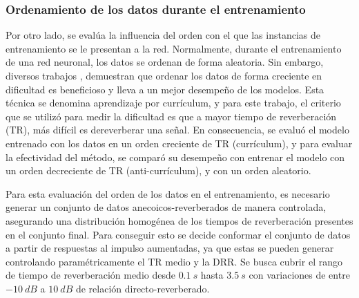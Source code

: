 \subsubsection{Ordenamiento de los datos durante el entrenamiento}

Por otro lado, se evalúa la influencia del orden con el que las instancias de entrenamiento se le presentan a la red. Normalmente, durante el entrenamiento de una red neuronal, los datos se ordenan de forma aleatoria. Sin embargo, diversos trabajos \cite{cv, cl1, cl2}, demuestran que ordenar los datos de forma creciente en dificultad es beneficioso y lleva a un mejor desempeño de los modelos. Esta técnica se denomina aprendizaje por currículum, y para este trabajo, el criterio que se utilizó para medir la dificultad es que a mayor tiempo de reverberación (TR), más difícil es dereverberar una señal. En consecuencia, se evaluó el modelo entrenado con los datos en un orden creciente de TR (currículum), y para evaluar la efectividad del método, se comparó su desempeño con entrenar el modelo con un orden decreciente de TR (anti-currículum), y con un orden aleatorio.

Para esta evaluación del orden de los datos en el entrenamiento, es necesario generar un conjunto de datos anecoicos-reverberados de manera controlada, asegurando una distribución homogénea de los tiempos de reverberación presentes en el conjunto final. Para conseguir esto se decide conformar el conjunto de datos a partir de respuestas al impulso aumentadas, ya que estas se pueden generar controlando paramétricamente el TR medio y la DRR. Se busca cubrir el rango de tiempo de reverberación medio desde $0.1 \ s$ hasta $3.5 \ s$ con variaciones de entre $-10 \ dB$ a $10 \ dB$ de relación directo-reverberado. 
